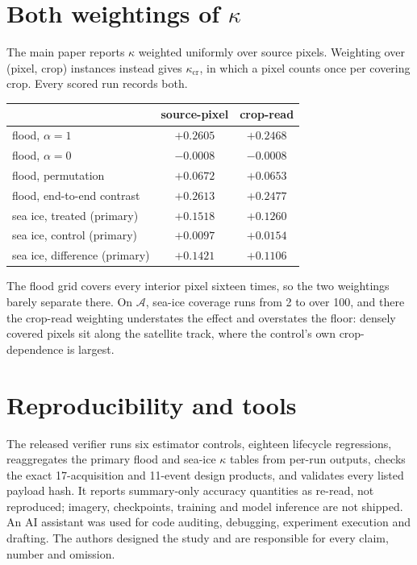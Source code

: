 \documentclass[10pt,twocolumn,letterpaper]{article}
\newcommand{\kap}{\kappa}
\newcommand{\kapcr}{\kappa_{\mathrm{cr}}}
\newcommand{\A}{\mathcal{A}}
\begin{document}
\section{Both weightings of \texorpdfstring{$\kap$}{kappa}}

The main paper reports $\kap$ weighted uniformly over source pixels. Weighting over
(pixel, crop) instances instead gives $\kapcr$, in which a pixel counts once per
covering crop. Every scored run records both.

\begin{center}
\small
\begin{tabular}{lcc}
\toprule
 & source-pixel & crop-read \\
\midrule
flood, $\alpha = 1$            & $+0.2605$ & $+0.2468$ \\
flood, $\alpha = 0$            & $-0.0008$ & $-0.0008$ \\
flood, permutation          & $+0.0672$ & $+0.0653$ \\
flood, end-to-end contrast  & $+0.2613$ & $+0.2477$ \\
sea ice, treated (primary)  & $+0.1518$ & $+0.1260$ \\
sea ice, control (primary)  & $+0.0097$ & $+0.0154$ \\
sea ice, difference (primary) & $+0.1421$ & $+0.1106$ \\
\bottomrule
\end{tabular}
\end{center}

The flood grid covers every interior pixel sixteen times, so the two weightings
barely separate there. On $\A$, sea-ice coverage runs from 2 to over 100, and there the
crop-read weighting understates the effect and overstates the floor: densely covered
pixels sit along the satellite track, where the control's own crop-dependence is
largest.

\section{Reproducibility and tools}

The released verifier runs six estimator controls, eighteen lifecycle regressions,
reaggregates the primary flood and sea-ice $\kap$ tables from per-run outputs, checks
the exact 17-acquisition and 11-event design products, and validates every listed
payload hash. It reports summary-only accuracy quantities as re-read, not reproduced;
imagery, checkpoints, training and model inference are not shipped. An AI assistant
was used for code auditing, debugging, experiment execution and drafting. The
authors designed the study and are responsible for every claim, number and omission.

\nolinenumbers
{
    \small
    
    
}
\end{document}
